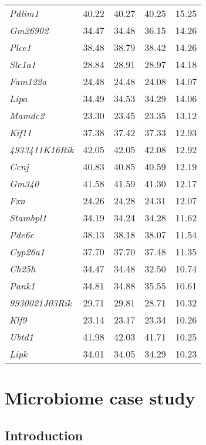 \documentclass[oneside]{book}
\begin{document}
\begin{table}[ht]
\begin{tabular}{>{\em}lrrrr}
  Pdlim1 & 40.22 & 40.27 & 40.25 & 15.25 \\
  Gm26902 & 34.47 & 34.48 & 36.15 & 14.26 \\
  Plce1 & 38.48 & 38.79 & 38.42 & 14.26 \\
  Slc1a1 & 28.84 & 28.91 & 28.97 & 14.18 \\
  Fam122a & 24.48 & 24.48 & 24.08 & 14.07 \\
  Lipa & 34.49 & 34.53 & 34.29 & 14.06 \\
  Mamdc2 & 23.30 & 23.45 & 23.35 & 13.12 \\
  Kif11 & 37.38 & 37.42 & 37.33 & 12.93 \\
  4933411K16Rik & 42.05 & 42.05 & 42.08 & 12.92 \\
  Ccnj & 40.83 & 40.85 & 40.59 & 12.19 \\
  Gm340 & 41.58 & 41.59 & 41.30 & 12.17 \\
  Fxn & 24.26 & 24.28 & 24.31 & 12.07 \\
  Stambpl1 & 34.19 & 34.24 & 34.28 & 11.62 \\
  Pde6c & 38.13 & 38.18 & 38.07 & 11.54 \\
  Cyp26a1 & 37.70 & 37.70 & 37.48 & 11.35 \\
  Ch25h & 34.47 & 34.48 & 32.50 & 10.74 \\
  Pank1 & 34.81 & 34.88 & 35.55 & 10.61 \\
  9930021J03Rik & 29.71 & 29.81 & 28.71 & 10.32 \\
  Klf9 & 23.14 & 23.17 & 23.34 & 10.26 \\
  Ubtd1 & 41.98 & 42.03 & 41.71 & 10.25 \\
  Lipk & 34.01 & 34.05 & 34.29 & 10.23 \\
   \hline
\end{tabular}
\endgroup
\end{table}




\section{Microbiome case study}
\subsection{Introduction}
\end{document}
